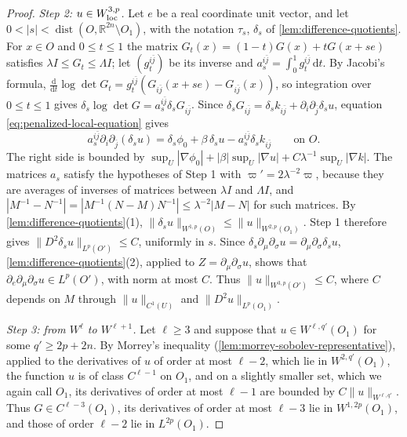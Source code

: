 \begin{proof}
\emph{Step 2: $u\in W^{3,p}_{\mathrm{loc}}$.} Let $e$ be a real coordinate unit vector, and let $0<|s|<\operatorname{dist}(O,\mathbb R^{2n}\setminus O_1)$, with the notation $\tau_s$, $\delta_s$ of \cref{lem:difference-quotients}. For $x\in O$ and $0\leq t\leq1$ the matrix $G_t(x)=(1-t)G(x)+tG(x+se)$ satisfies $\lambda I\leq G_t\leq\Lambda I$; let $(g_t^{i\bar j})$ be its inverse and $a_s^{i\bar j}=\int_0^1g_t^{i\bar j}\,\mathrm dt$. By Jacobi's formula, $\frac{\mathrm d}{\mathrm dt}\log\det G_t=g_t^{i\bar j}(G_{i\bar j}(x+se)-G_{i\bar j}(x))$, so integration over $0\leq t\leq1$ gives $\delta_s\log\det G=a_s^{i\bar j}\delta_sG_{i\bar j}$. Since $\delta_sG_{i\bar j}=\delta_sk_{i\bar j}+\partial_i\partial_{\bar j}\delta_su$, equation \eqref{eq:penalized-local-equation} gives
\[
 a_s^{i\bar j}\partial_i\partial_{\bar j}(\delta_su)=\delta_s\phi_0+\beta\,\delta_su-a_s^{i\bar j}\delta_sk_{i\bar j}\qquad\text{on }O.
\]
The right side is bounded by $\sup_U|\nabla\phi_0|+|\beta|\sup_U|\nabla u|+C\lambda^{-1}\sup_U|\nabla k|$. The matrices $a_s$ satisfy the hypotheses of Step 1 with $\varpi'=2\lambda^{-2}\varpi$, because they are averages of inverses of matrices between $\lambda I$ and $\Lambda I$, and $|M^{-1}-N^{-1}|=|M^{-1}(N-M)N^{-1}|\leq\lambda^{-2}|M-N|$ for such matrices. By \cref{lem:difference-quotients}(1), $\|\delta_su\|_{W^{1,p}(O)}\leq\|u\|_{W^{2,p}(O_1)}$. Step 1 therefore gives $\|D^2\delta_su\|_{L^p(O')}\leq C$, uniformly in $s$. Since $\delta_s\partial_\mu\partial_\sigma u=\partial_\mu\partial_\sigma\delta_su$, \cref{lem:difference-quotients}(2), applied to $Z=\partial_\mu\partial_\sigma u$, shows that $\partial_e\partial_\mu\partial_\sigma u\in L^p(O')$, with norm at most $C$. Thus $\|u\|_{W^{3,p}(O')}\leq C$, where $C$ depends on $M$ through $\|u\|_{C^1(U)}$ and $\|D^2u\|_{L^p(O_1)}$.

\emph{Step 3: from $W^{\ell}$ to $W^{\ell+1}$.} Let $\ell\geq3$ and suppose that $u\in W^{\ell,q'}(O_1)$ for some $q'\geq2p+2n$. By Morrey's inequality (\cref{lem:morrey-sobolev-representative}), applied to the derivatives of $u$ of order at most $\ell-2$, which lie in $W^{2,q'}(O_1)$, the function $u$ is of class $C^{\ell-1}$ on $O_1$, and on a slightly smaller set, which we again call $O_1$, its derivatives of order at most $\ell-1$ are bounded by $C\|u\|_{W^{\ell,q'}}$. Thus $G\in C^{\ell-3}(O_1)$, its derivatives of order at most $\ell-3$ lie in $W^{1,2p}(O_1)$, and those of order $\ell-2$ lie in $L^{2p}(O_1)$.


\end{proof}
